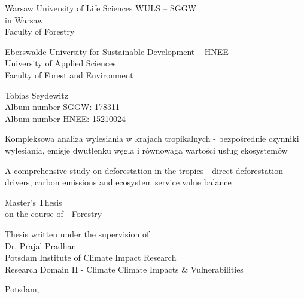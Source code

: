 \begin{titlepage}
	\begin{singlespace}
		\begin{center}
			\Large{Warsaw University of Life Sciences WULS – SGGW}\\
			\Large{in Warsaw}\\
			\Large{Faculty of Forestry}

			\smallskip

			\Large{Eberswalde University for Sustainable Development – HNEE}\\
			\Large{University of Applied Sciences}\\
			\Large{Faculty of Forest and Environment}

			\bigskip

			\large{Tobias Seydewitz}\\
			\normalsize{Album number SGGW: 178311}\\
			\normalsize{Album number HNEE: 15210024}

			\vspace{2cm}
 
			 \huge{Kompleksowa analiza wylesiania w krajach tropikalnych - bezpośrednie czynniki wylesiania, emisje dwutlenku węgla i równowaga wartości usług ekosystemów}

			 \Large{A comprehensive study on deforestation in the tropics - direct deforestation drivers, carbon emissions and ecosystem service value balance}

			\bigskip

			\large{Master's Thesis}\\
			\large{on the course of - Forestry}

			\vspace{2cm}

			\begin{flushright}
				\normalsize{Thesis written under the supervision of}\\
				\normalsize{Dr. Prajal Pradhan}\\
				\normalsize{Potsdam Institute of Climate Impact Research}\\
				\normalsize{Research Domain II - Climate Climate Impacts \& Vulnerabilities}
			\end{flushright}

			\bigskip

			\normalsize{Potsdam, \the\year}
		\end{center}
	\end{singlespace}
\end{titlepage}